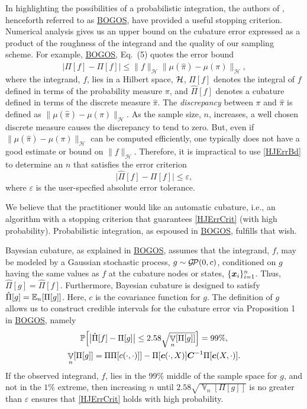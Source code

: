 \documentclass[sts]{imsart}
\numberwithin{equation}{section}
\theoremstyle{plain}
\newcommand{\calH}{\mathcal{H}}
\newcommand{\vC}{\boldsymbol{C}}
\newcommand{\calGP}{\cg\!\cp}
\DeclareMathOperator{\Var}{\mathbb{V}}
\newcommand{\BOGOS}{\hyperlink{BriEtal18a}{BOGOS}\xspace}
\begin{document}
In highlighting the possibilities of a probabilistic integration, the authors of \cite{BriEtal18a}, henceforth referred to as \BOGOS, have provided a useful stopping criterion.  Numerical analysis gives us an upper bound on the cubature error expressed as a product of the roughness of the integrand and the quality of our sampling scheme.  For example, \BOGOS, Eq.\ (5) quotes the error bound
\begin{equation} \label{HJErrBd}
    \bigl \lvert \hat{\Pi}[f] - \Pi[f] \rvert \le \lVert f \rVert_{\calH} \lVert \mu(\hat{\pi}) - \mu(\pi) \rVert_{\calH},
\end{equation}
where the integrand, $f$, lies in a Hilbert space, $\mathcal{H}$, $\Pi[f]$ denotes the integral of $f$ defined in terms of the probability measure $\pi$, and $\hat{\Pi}[f]$ denotes a cubature defined in terms of the discrete measure $\hat{\pi}$. The \emph{discrepancy} between $\pi$ and $\hat{\pi}$ is defined as $\lVert \mu(\hat{\pi}) - \mu(\pi) \rVert_{\calH}$. As the sample size, $n$, increases, a well chosen discrete measure causes the discrepancy to tend to zero.  But, even if $\lVert \mu(\hat{\pi}) - \mu(\pi) \rVert_{\calH}$ can be computed efficiently, one typically does not have a good estimate or bound on $\lVert f \rVert_{\calH}$.  Therefore, it is impractical to use  \eqref{HJErrBd} to determine an $n$ that satisfies the error criterion
\begin{equation} \label{HJErrCrit}
    \bigl \lvert \hat{\Pi}[f] - \Pi[f] \bigr \rvert \le \varepsilon,
\end{equation}
where $\varepsilon$ is the user-specfied absolute error tolerance.  

We believe that the practitioner would like an automatic cubature, i.e., an algorithm with a stopping criterion that guarantees \eqref{HJErrCrit} (with high probability).  Probabilistic integration, as espoused in \BOGOS, fulfills that wish.  

Bayesian cubature, as explained in \BOGOS, assumes that the integrand, $f$, may be modeled by a Gaussian stochastic process, $g \sim \calGP(0,c)$, conditioned on $g$ having the same values as $f$ at the cubature nodes or states, $\{\boldsymbol{x}_i\}_{i=1}^n$.  Thus, $\hat{\Pi}[g] = \hat{\Pi}[f]$.  Furthermore, Bayesian cubature is designed to satisfy $\hat{\Pi}[g] = \operatorname{\mathbb{E}}_n[\Pi[g]]$.  Here, $c$ is the covariance function for $g$.  The definition of $g$ allows us to construct credible intervals for the cubature error via Proposition 1 in  \BOGOS, namely
\begin{gather}
\label{credInt}
    \Prob\Bigl[\bigl \lvert \hat{\Pi}[f] - \Pi[g] \bigr \rvert \le 2.58 \sqrt{\Var_n[\Pi[g]]}  \Bigr] = 99\%, \\
    \label{Vnform}
    \Var_n[\Pi[g]] = \Pi\Pi[c(\cdot,\cdot)]] - \Pi[\vc(\cdot,X)] \vC^{-1} \Pi[\vc(X,\cdot)].
\end{gather}
If the observed integrand, $f$, lies in the $99\%$ middle of the sample space for $g$, and not in the $1\%$ extreme, then increasing $n$ until $2.58 \sqrt{\Var_n[\Pi[g]]}$ is no greater than $\varepsilon$ ensures that  \eqref{HJErrCrit} holds with high probability.
\end{document}
